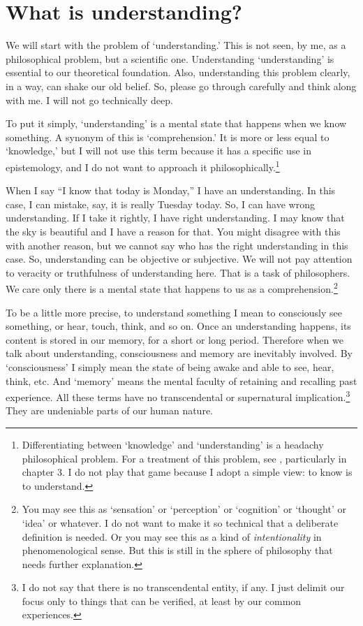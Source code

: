 \chapter{What is understanding?}\label{chap:whatunder}

We will start with the problem of `understanding.' This is not seen, by me, as a philosophical problem, but a scientific one. Understanding `understanding' is essential to our theoretical foundation. Also, understanding this problem clearly, in a way, can shake our old belief. So, please go through carefully and think along with me. I will not go technically deep.

To put it simply, `understanding' is a mental state that happens when we know something. A synonym of this is `comprehension.' It is more or less equal to `knowledge,' but I will not use this term because it has a specific use in epistemology, and I do not want to approach it philosophically.\footnote{Differentiating between `knowledge' and `understanding' is a headachy philosophical problem. For a treatment of this problem, see \citealp{mason:understanding}, particularly in chapter 3. I do not play that game because I adopt a simple view: to know is to understand.}

When I say ``I know that today is Monday,'' I have an understanding. In this case, I can mistake, say, it is really Tuesday today. So, I can have wrong understanding. If I take it rightly, I have right understanding. I may know that the sky is beautiful and I have a reason for that. You might disagree with this with another reason, but we cannot say who has the right understanding in this case. So, understanding can be objective or subjective. We will not pay attention to veracity or truthfulness of understanding here. That is a task of philosophers. We care only there is a mental state that happens to us as a comprehension.\footnote{You may see this as `sensation' or `perception' or `cognition' or `thought' or `idea' or whatever. I do not want to make it so technical that a deliberate definition is needed. Or you may see this as a kind of \emph{intentionality} in phenomenological sense. But this is still in the sphere of philosophy that needs further explanation.}

To be a little more precise, to understand something I mean to consciously see something, or hear, touch, think, and so on. Once an understanding happens, its content is stored in our memory, for a short or long period. Therefore when we talk about understanding, consciousness and memory are inevitably involved. By `consciousness' I simply mean the state of being awake and able to see, hear, think, etc. And `memory' means the mental faculty of retaining and recalling past experience. All these terms have no transcendental or supernatural implication.\footnote{I do not say that there is no transcendental entity, if any. I just delimit our focus only to things that can be verified, at least by our common experiences.} They are undeniable parts of our human nature.

